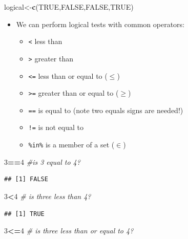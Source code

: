 \documentclass[]{book}
\newenvironment{Shaded}{\begin{snugshade}}{\end{snugshade}}
\newcommand{\KeywordTok}[1]{\textcolor[rgb]{0.13,0.29,0.53}{\textbf{#1}}}
\newcommand{\DecValTok}[1]{\textcolor[rgb]{0.00,0.00,0.81}{#1}}
\newcommand{\CommentTok}[1]{\textcolor[rgb]{0.56,0.35,0.01}{\textit{#1}}}
\newcommand{\OtherTok}[1]{\textcolor[rgb]{0.56,0.35,0.01}{#1}}
\newcommand{\OperatorTok}[1]{\textcolor[rgb]{0.81,0.36,0.00}{\textbf{#1}}}
\newcommand{\NormalTok}[1]{#1}
\providecommand{\tightlist}{%
  \setlength{\itemsep}{0pt}\setlength{\parskip}{0pt}}
\theoremstyle{definition}
\theoremstyle{definition}
\theoremstyle{definition}
\theoremstyle{remark}
\begin{document}
\begin{Shaded}
\begin{Highlighting}[]
\NormalTok{logical<-}\KeywordTok{c}\NormalTok{(}\OtherTok{TRUE}\NormalTok{,}\OtherTok{FALSE}\NormalTok{,}\OtherTok{FALSE}\NormalTok{,}\OtherTok{TRUE}\NormalTok{)}
\end{Highlighting}
\end{Shaded}

\begin{itemize}
\tightlist
\item
  We can perform logical tests with common operators:

  \begin{itemize}
  \tightlist
  \item
    \texttt{\textless{}} less than
  \item
    \texttt{\textgreater{}} greater than
  \item
    \texttt{\textless{}=} less than or equal to (\(\leq\))
  \item
    \texttt{\textgreater{}=} greater than or equal to (\(\geq\))
  \item
    \texttt{==} is equal to (note two equals signs are needed!)
  \item
    \texttt{!=} is not equal to
  \item
    \texttt{\%in\%} is a member of a set (\(\in\))
  \end{itemize}
\end{itemize}

\begin{Shaded}
\begin{Highlighting}[]
\DecValTok{3}\OperatorTok{==}\DecValTok{4} \CommentTok{#is 3 equal to 4?}
\end{Highlighting}
\end{Shaded}

\begin{verbatim}
## [1] FALSE
\end{verbatim}

\begin{Shaded}
\begin{Highlighting}[]
\DecValTok{3}\OperatorTok{<}\DecValTok{4} \CommentTok{# is three less than 4?}
\end{Highlighting}
\end{Shaded}

\begin{verbatim}
## [1] TRUE
\end{verbatim}

\begin{Shaded}
\begin{Highlighting}[]
\DecValTok{3}\OperatorTok{<=}\DecValTok{4} \CommentTok{# is three less than or equal to 4?}
\end{Highlighting}
\end{Shaded}
\end{document}
